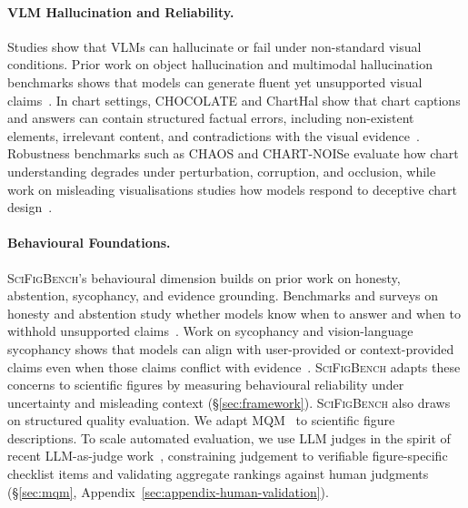 
\paragraph{VLM Hallucination and Reliability.}
Studies show that VLMs can hallucinate or fail under non-standard visual conditions. Prior work on object hallucination and multimodal hallucination benchmarks shows that models can generate fluent yet unsupported visual claims~\citep{rohrbach2018object,li2023pope,guan2024hallusionbench,bai2024hallucination}. In chart settings, CHOCOLATE and ChartHal show that chart captions and answers can contain structured factual errors, including non-existent elements, irrelevant content, and contradictions with the visual evidence~\citep{huang2024chocolate,cui2025charthal}. Robustness benchmarks such as CHAOS \citep{moured2025chaos} and CHART-NOISe \citep{mahbub2025perils}
evaluate how chart understanding degrades under perturbation, corruption, and occlusion, while work on misleading visualisations studies how models respond to deceptive chart design~\citep{tonglet2026protecting,mahbub2025perils}.


\paragraph{Behavioural Foundations.}
\textsc{SciFigBench}'s behavioural dimension builds on prior work on honesty, abstention, sycophancy, and evidence grounding. Benchmarks and surveys on honesty and abstention study whether models know when to answer and when to withhold unsupported claims~\citep{chern2024behonest,wen2025knowlimits,wei2024simpleqa,ren2024selective,kadavath2022language}. Work on sycophancy and vision-language sycophancy shows that models can align with user-provided or context-provided claims even when those claims conflict with evidence~\citep{sharma2024sycophancy,fanous2025syceval}. \textsc{SciFigBench} adapts these concerns to scientific figures by measuring behavioural reliability under uncertainty and misleading context (\S\ref{sec:framework}).
\textsc{SciFigBench} also draws on structured quality evaluation. We adapt MQM~\citep{lommel2014multidimensional,freitag2021experts} to scientific figure descriptions. To scale automated evaluation, we use LLM judges in the spirit of recent LLM-as-judge work~\citep{zheng2023judging}, constraining judgement to verifiable figure-specific checklist items and validating aggregate rankings against human judgments (\S\ref{sec:mqm}, Appendix~\ref{sec:appendix-human-validation}). 

